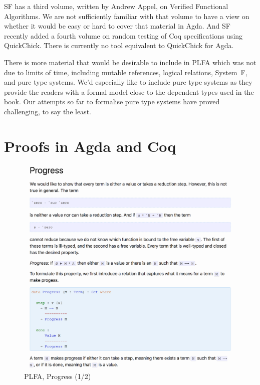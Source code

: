 \documentclass[preprint,authoryear]{elsarticle}
\begin{document}
SF has a third volume, written by Andrew Appel, on Verified Functional
Algorithms. We are not sufficiently familiar with that volume to have a view on
whether it would be easy or hard to cover that material in Agda. And SF recently
added a fourth volume on random testing of Coq specifications using QuickChick.
There is currently no tool equivalent to QuickChick for Agda.

There is more material that would be desirable to include in PLFA which was not
due to limits of time, including mutable references, logical relations, System~F, and
pure type systems. We'd especially like to include pure type systems as they
provide the readers with a formal model close to the dependent types used in the
book.  Our attempts so far to formalise pure type systems have proved
challenging, to say the least.

\section{Proofs in Agda and Coq}

\begin{figure}[t]
  \includegraphics[width=\textwidth]{figures/plfa-progress-1.png}
  \caption{PLFA, Progress (1/2)}
  \label{fig:plfa-progress-1}
\end{figure}  
\end{document}
